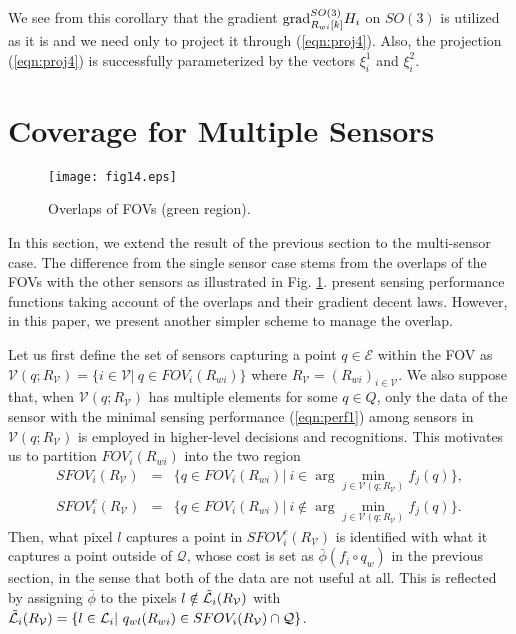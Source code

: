 \documentclass[conference,letterpaper]{ieeeconf}
\newcommand{\grad}{{\rm grad}}
\newcommand{\V}{{\mathcal V}}
\newcommand{\E}{{\mathcal E}}
\newcommand{\Q}{{\mathcal Q}}
\newcommand{\ewi}{R_{wi}}
\renewcommand{\L}{{\cal L}}
\begin{document}
We see from this corollary  
that the gradient
$\grad_{\ewi[k]}^{SO(3)} H_i$ on $SO(3)$ 
is utilized as it is and we need only to project it
through (\ref{eqn:proj4}).
Also, the projection (\ref{eqn:proj4}) is successfully 
parameterized by the vectors $\xi_i^1$ and $\xi_i^2$.







\section{Coverage for Multiple Sensors}



\begin{figure}[t]
\begin{center}
\texttt{[image: fig14.eps]}
\caption{Overlaps of FOVs (green region).}
\label{fig:overlap}
\end{center}
\end{figure}




In this section, we extend the result of the previous section to the
multi-sensor case.
The difference from the single sensor case stems from the overlaps
of the FOVs with the other sensors as illustrated in Fig. \ref{fig:overlap}.
\cite{EYE,CL_EJC05,BCM_ES05} present sensing performance functions
taking account of the overlaps and their gradient decent laws.
However, in this paper, we present another simpler scheme to manage the overlap.




Let us first define the set of sensors capturing a point $q \in \E$ within the FOV as
${\mathcal V}(q;R_{\V}) = \{i\in \V|\ q \in FOV_i(\ewi)\}$
where $R_{\V} = (\ewi)_{i\in \V}$.
We also suppose that, when $\V(q;R_{\V})$ has multiple elements for some $q \in Q$,
only the data of the sensor with the minimal 
sensing performance (\ref{eqn:perf1})
among sensors in $\V(q;R_{\V})$ is employed in higher-level decisions and recognitions.
This motivates us to partition $FOV_i(\ewi)$ into the two region 
\begin{eqnarray}
SFOV_i(R_{\V}) \!\!&\!\!=\!\!&\!\! \{q \in FOV_i(\ewi)|\ i \in \arg\min_{j \in \V(q;R_{\V})} f_j(q)\},
\nonumber
\label{eqn:SFOV}\\
SFOV^c_i(R_{\V}) \!\!&\!\!=\!\!&\!\! \{q \in FOV_i(\ewi)|\ i \notin \arg\min_{j \in \V(q;R_{\V})} f_j(q)\}.
\nonumber
\label{eqn:SFOVc}
\end{eqnarray}
Then, what pixel $l$ captures a point in $SFOV^c_i(R_{\V})$
is identified with what it captures a point outside of $\Q$,
whose cost is set as $\bar \phi (f_i\circ q_w)$ in the previous section,
in the sense that both of the data are not useful at all. 
This is reflected by assigning $\bar{\phi}$ to the pixels $l \notin \tilde \L_i(R_{\V})$
with
$\tilde \L_i(R_{\V})= \{l\in \L_i|\ q_{wl}(\ewi) \in SFOV_i(R_{\V}) \cap \Q\}$.
\end{document}
